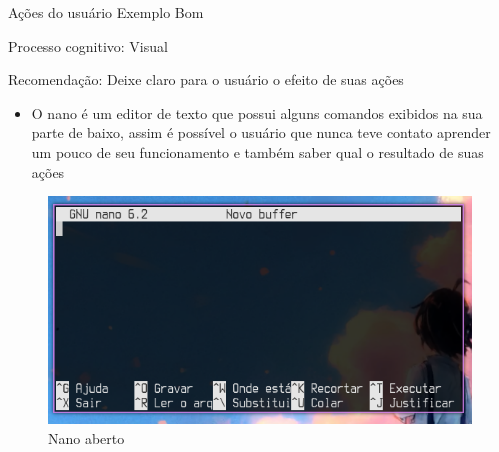 \documentclass{beamer}
\begin{document}
\begin{frame}{Ações do usuário Exemplo Bom}

Processo cognitivo: Visual

Recomendação: Deixe claro para o usuário o efeito de suas ações

\begin{itemize}
    \item O nano é um editor de texto que possui alguns comandos exibidos na sua parte de baixo, assim é possível o usuário que nunca teve contato aprender um pouco de seu funcionamento e também saber qual o resultado de suas ações
\end{itemize}
\begin{figure}
    \centering
    \includegraphics[scale=0.4]{images/nano.png}
    \caption{Nano aberto}
\end{figure}

\end{frame}
\end{document}
